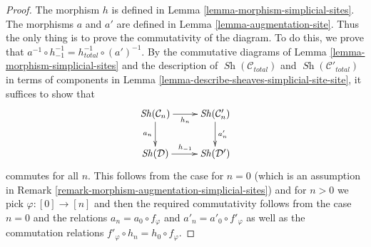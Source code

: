\documentclass{stacks-project}
\theoremstyle{plain}
\theoremstyle{definition}
\theoremstyle{remark}
\numberwithin{equation}{subsection}
\def\Sh{\mathop{\mathit{Sh}}\nolimits}
\begin{document}
\begin{proof}
The morphism $h$ is defined in Lemma \ref{lemma-morphism-simplicial-sites}.
The morphisms $a$ and $a'$ are defined in Lemma \ref{lemma-augmentation-site}.
Thus the only thing is to prove the commutativity of the diagram.
To do this, we prove that
$a^{-1} \circ h_{-1}^{-1} = h_{total}^{-1} \circ (a')^{-1}$.
By the commutative diagrams of
Lemma \ref{lemma-morphism-simplicial-sites}
and the description of $\Sh(\mathcal{C}_{total})$
and $\Sh(\mathcal{C}'_{total})$ in terms of components
in Lemma \ref{lemma-describe-sheaves-simplicial-site-site},
it suffices to show that
$$
\xymatrix{
\Sh(\mathcal{C}_n) \ar[d]_{a_n} \ar[r]_{h_n} &
\Sh(\mathcal{C}'_n) \ar[d]^{a'_n} \\
\Sh(\mathcal{D}) \ar[r]^{h_{-1}} &
\Sh(\mathcal{D}')
}
$$
commutes for all $n$. This follows from the case for $n = 0$
(which is an assumption in
Remark \ref{remark-morphism-augmentation-simplicial-sites})
and for $n > 0$ we pick $\varphi : [0] \to [n]$
and then the required commutativity follows from the case $n = 0$
and the relations $a_n = a_0 \circ f_\varphi$
and $a'_n = a'_0 \circ f'_\varphi$
as well as the commutation relations
$f'_\varphi \circ h_n = h_0 \circ f_\varphi$.
\end{proof}
\end{document}
